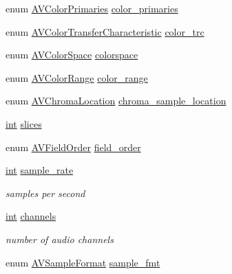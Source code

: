 \begin{DoxyCompactItemize}
\item 
enum \hyperlink{group__lavc__core_gad384ee5a840bafd73daef08e6d9cafe7}{A\+V\+Color\+Primaries} \hyperlink{struct_a_v_codec_context_a3a41b3e5bde23b877799f6e72dac8ef3}{color\+\_\+primaries}
\item 
enum \hyperlink{group__lavc__core_gad4791ea14975f098b649db7fcd731ce6}{A\+V\+Color\+Transfer\+Characteristic} \hyperlink{struct_a_v_codec_context_ab649e8c599f5a0e2a30448e67a36deb6}{color\+\_\+trc}
\item 
enum \hyperlink{ffmpeg_2libavutil_2frame_8h_aff71a069509a1ad3ff54d53a1c894c85}{A\+V\+Color\+Space} \hyperlink{struct_a_v_codec_context_a8cd8caa7d40319324ce3d879a2edbd9f}{colorspace}
\item 
enum \hyperlink{ffmpeg_2libavutil_2frame_8h_a3da0bf691418bc22c4bcbe6583ad589a}{A\+V\+Color\+Range} \hyperlink{struct_a_v_codec_context_a255bf7100a4ba6dcb6ee5d87740a4f35}{color\+\_\+range}
\item 
enum \hyperlink{group__lavc__core_ga1f86ed1b6a420faccacf77c98db6c1ff}{A\+V\+Chroma\+Location} \hyperlink{struct_a_v_codec_context_ac60a0209642b5d74068cab0ac35a78b2}{chroma\+\_\+sample\+\_\+location}
\item 
\hyperlink{xmltok_8h_a5a0d4a5641ce434f1d23533f2b2e6653}{int} \hyperlink{struct_a_v_codec_context_aff4e6a78c0f08be43879644632e04b24}{slices}
\item 
enum \hyperlink{group__lavc__core_ga957ef25581a6b3c98589817b1cbed02c}{A\+V\+Field\+Order} \hyperlink{struct_a_v_codec_context_a5d222eeeb0b54ab462af363bcb9273bc}{field\+\_\+order}
\item 
\hyperlink{xmltok_8h_a5a0d4a5641ce434f1d23533f2b2e6653}{int} \hyperlink{struct_a_v_codec_context_a8ff0b000c463361e234af48d03aadfc0}{sample\+\_\+rate}
\begin{DoxyCompactList}\small\item\em samples per second \end{DoxyCompactList}\item 
\hyperlink{xmltok_8h_a5a0d4a5641ce434f1d23533f2b2e6653}{int} \hyperlink{struct_a_v_codec_context_ac1e6c2cd1269caa7570575725c682a49}{channels}
\begin{DoxyCompactList}\small\item\em number of audio channels \end{DoxyCompactList}\item 
enum \hyperlink{samplefmt_8h_af9a51ca15301871723577c730b5865c5}{A\+V\+Sample\+Format} \hyperlink{struct_a_v_codec_context_a1bdba69ea111e2a9d03fdaa7a46a4c45}{sample\+\_\+fmt}

\end{DoxyCompactItemize}
